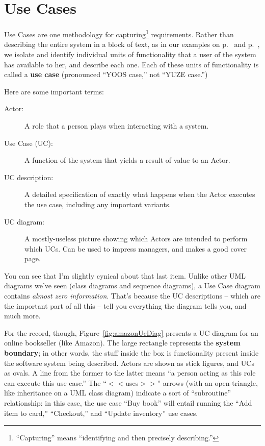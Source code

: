 \section{Use Cases}

Use Cases are one methodology for capturing\footnote{``Capturing'' means
``identifying and then precisely describing.''} requirements. Rather than
describing the entire system in a block of text, as in our examples on
p.~\pageref{blockRequirements1} and
p.~\pageref{blockRequirements2}, we isolate and identify individual units of
functionality that a user of the system has available to her, and describe
each one. Each of these units of functionality is called a \textbf{use case}
(pronounced ``YOOS case,'' not ``YUZE case.'')

Here are some important terms:

\begin{description}
\item[Actor:] A role that a person plays when interacting with a system.
\item[Use Case (UC):] A function of the system that yields a result of value to an
Actor.
\item[UC description:] A detailed specification of exactly what happens
when the Actor executes the use case, including any important variants.
\item[UC diagram:] A mostly-useless picture showing which Actors are
intended to perform which UCs. Can be used to impress managers, and
makes a good cover page.
\end{description}

You can see that I'm slightly cynical about that last item. Unlike other UML
diagrams we've seen (class diagrams and sequence diagrams), a Use Case diagram
contains \textit{almost zero information}. That's because the UC descriptions
-- which are the important part of all this -- tell you everything the diagram
tells you, and much more.

For the record, though, Figure~\ref{fig:amazonUcDiag} presents a UC diagram
for an online bookseller (like Amazon). The large rectangle represents the
\textbf{system boundary}; in other words, the stuff inside the box is
functionality present inside the software system being described. Actors are
shown as stick figures, and UCs as ovals. A line from the former to the latter
means ``a person acting as this role can execute this use case.'' The
``$<<$uses$>>$'' arrows (with an open-triangle, like inheritance on a UML class
diagram) indicate a sort of ``subroutine'' relationship: in this case, the use
case ``Buy book'' will entail running the ``Add item to card,'' ``Checkout,''
and ``Update inventory'' use cases.

